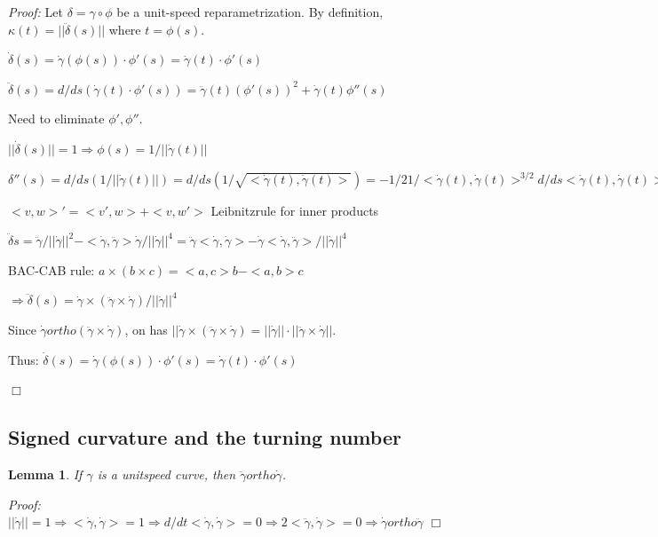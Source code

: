 \documentclass[a4paper,11pt,notitlepage,fullpage]{paper}
\theoremstyle{plain}
\newtheorem{lem}[thm]{Lemma}
\theoremstyle{definition}
\begin{document}
\emph{Proof:} Let $\delta = \gamma \circ \phi$ be a unit-speed reparametrization. By definition, $\kappa(t) = ||\ddot\delta(s)||$ where $t = \phi(s)$. 

$\dot\delta(s) = \dot\gamma(\phi(s)) \cdot \phi'(s) = \dot\gamma(t) \cdot \phi'(s)$

$\ddot\delta(s) = d/ds (\dot\gamma(t) \cdot \phi'(s)) = \ddot\gamma(t) (\phi'(s))^2 + \dot\gamma(t)\phi''(s)$

Need to eliminate $\phi', \phi''$. 

$||\dot\delta(s)|| = 1 \Rightarrow \phi(s) = 1/||\dot\gamma(t)||$

$\delta''(s) = d/ds (1/||\dot\gamma(t)||) = d/ds ( 1/\sqrt{<\dot\gamma(t), \dot\gamma(t)>}) = -1/2 1/<\dot\gamma(t), \dot\gamma(t)>^{3/2} d/ds <\dot\gamma(t), \dot\gamma(t)> = -1/2 1/||\dot\gamma(t)||^3 2 <\ddot\gamma(t) \phi'(s), \dot\gamma(t)> = - <\ddot\gamma(t), \dot\gamma(t)> \phi'(s)/||\dot\gamma||^3 = - <\ddot\gamma(t), \dot\gamma(t)>/||\dot\gamma||^4$

$<v,w>' = <v',w> + <v,w'>$ Leibnitzrule for inner products

$\ddot\delta{s} = \ddot\gamma/||\dot\gamma||^2 - <\dot\gamma, \ddot\gamma> \dot\gamma / ||\dot\gamma||^4 = \ddot\gamma <\dot\gamma, \dot\gamma> - \dot\gamma<\dot\gamma, \ddot\gamma> / ||\dot\gamma||^4$

BAC-CAB rule: $a \times (b\times c) = <a,c>b-<a,b>c$

$\Rightarrow \ddot\delta(s) = \dot\gamma \times (\ddot\gamma \times \dot\gamma) / ||\dot\gamma||^4$

Since $\dot\gamma ortho (\ddot\gamma \times \dot\gamma)$, on has $||\dot\gamma \times (\ddot\gamma \times \dot\gamma) = ||\dot\gamma|| \cdot ||\ddot\gamma \times \dot\gamma||$.

Thus: $\dot\delta(s) = \dot\gamma(\phi(s)) \cdot \phi'(s) = \dot\gamma(t) \cdot \phi'(s)$

 \hfill $\Box$


\subsection{Signed curvature and the turning number}

\begin{lem}
If $\gamma$ is a unitspeed curve, then $\ddot\gamma ortho \dot\gamma$.
\end{lem}

\emph{Proof:} $||\dot\gamma|| = 1 \Rightarrow <\dot\gamma, \dot\gamma> = 1 \Rightarrow d/dt <\dot\gamma, \dot\gamma> = 0 \Rightarrow 2 <\ddot\gamma, \dot\gamma> = 0 \Rightarrow \dot\gamma ortho \ddot\gamma$ \hfill $\Box$
\end{document}
